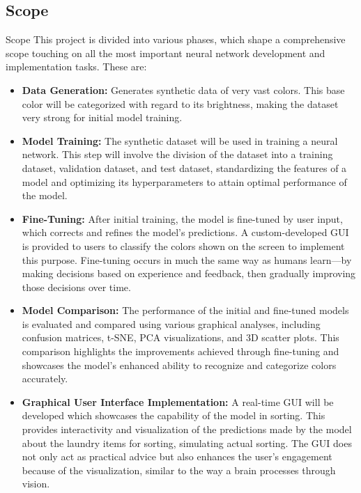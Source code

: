 \documentclass{article}
\begin{document}
\subsection{Scope}
Scope This project is divided into various phases, which shape a comprehensive scope touching on all the most important neural network development and implementation tasks. These are:
\begin{itemize}
    \item \textbf{Data Generation:} Generates synthetic data of very vast colors. This base color will be categorized with regard to its brightness, making the dataset very strong for initial model training.
    \item \textbf{Model Training:} The synthetic dataset will be used in training a neural network. This step will involve the division of the dataset into a training dataset, validation dataset, and test dataset, standardizing the features of a model and optimizing its hyperparameters to attain optimal performance of the model.
    \item \textbf{Fine-Tuning:}  After initial training, the model is fine-tuned by user input, which corrects and refines the model's predictions. A custom-developed GUI is provided to users to classify the colors shown on the screen to implement this purpose. Fine-tuning occurs in much the same way as humans learn—by making decisions based on experience and feedback, then gradually improving those decisions over time.
    \item \textbf{Model Comparison:} The performance of the initial and fine-tuned models is evaluated and compared using various graphical analyses, including confusion matrices, t-SNE, PCA visualizations, and 3D scatter plots. This comparison highlights the improvements achieved through fine-tuning and showcases the model's enhanced ability to recognize and categorize colors accurately.
    \item \textbf{Graphical User Interface Implementation:} A real-time GUI will be developed which showcases the capability of the model in sorting. This provides interactivity and visualization of the predictions made by the model about the laundry items for sorting, simulating actual sorting. The GUI does not only act as practical advice but also enhances the user's engagement because of the visualization, similar to the way a brain processes through vision.
  \end{itemize}
\end{document}
